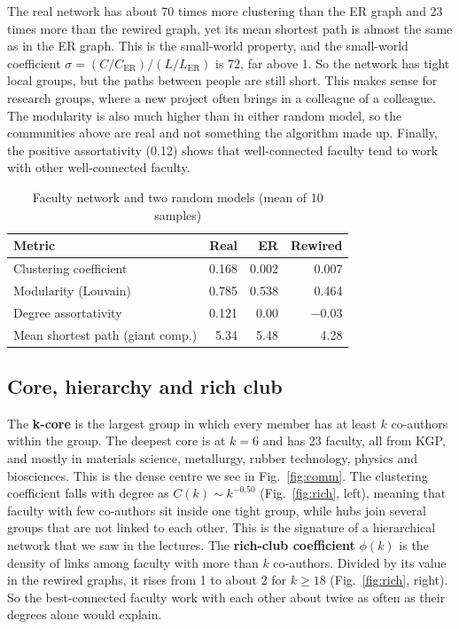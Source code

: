 \documentclass[conference,10pt]{IEEEtran}
\begin{document}
The real network has about 70 times more clustering than the ER graph and 23 times more than the rewired graph, yet its
mean shortest path is almost the same as in the ER graph. This is the small-world property, and the small-world
coefficient $\sigma = (C/C_{\text{ER}})/(L/L_{\text{ER}})$ is 72, far above 1. So the network has tight local groups,
but the paths between people are still short. This makes sense for research groups, where a new project often brings
in a colleague of a colleague. The modularity is also much higher than in either random model, so the communities
above are real and not something the algorithm made up. Finally, the positive assortativity (0.12) shows that
well-connected faculty tend to work with other well-connected faculty.

\begin{table}[!t]
\centering
\caption{Faculty network and two random models (mean of 10 samples)}
\label{tab:null}
\footnotesize
\begin{tabular}{@{}lrrr@{}}
\toprule
\textbf{Metric} & \textbf{Real} & \textbf{ER} & \textbf{Rewired} \\
\midrule
Clustering coefficient           & 0.168 & 0.002 & 0.007 \\
Modularity (Louvain)             & 0.785 & 0.538 & 0.464 \\
Degree assortativity             & 0.121 & 0.00  & $-0.03$ \\
Mean shortest path (giant comp.) & 5.34  & 5.48  & 4.28 \\
\bottomrule
\end{tabular}
\end{table}

\subsection{Core, hierarchy and rich club}
The \textbf{k-core} is the largest group in which every member has at least $k$ co-authors within the group. The
deepest core is at $k=6$ and has 23 faculty, all from KGP, and mostly in materials science, metallurgy, rubber
technology, physics and biosciences. This is the dense centre we see in Fig.~\ref{fig:comm}. The clustering
coefficient falls with degree as $C(k) \sim k^{-0.50}$ (Fig.~\ref{fig:rich}, left), meaning that faculty with few
co-authors sit inside one tight group, while hubs join several groups that are not linked to each other. This is the
signature of a hierarchical network that we saw in the lectures. The \textbf{rich-club coefficient} $\phi(k)$ is the
density of links among faculty with more than $k$ co-authors. Divided by its value in the rewired graphs, it rises from
1 to about 2 for $k \ge 18$ (Fig.~\ref{fig:rich}, right). So the best-connected faculty work with each other about
twice as often as their degrees alone would explain.
\end{document}
